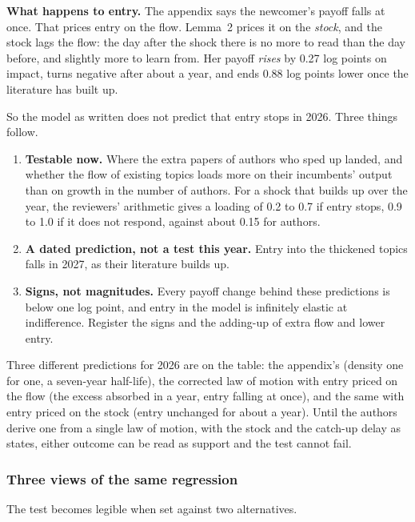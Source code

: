 \textbf{What happens to entry.} The appendix says the newcomer's payoff falls at once. That prices entry on the flow. Lemma~2 prices it on the \emph{stock}, and the stock lags the flow: the day after the shock there is no more to read than the day before, and slightly more to learn from. Her payoff \emph{rises} by 0.27 log points on impact, turns negative after about a year, and ends 0.88 log points lower once the literature has built up.

So the model as written does not predict that entry stops in 2026. Three things follow.

\begin{enumerate}
\item \textbf{Testable now.} Where the extra papers of authors who sped up landed, and whether the flow of existing topics loads more on their incumbents' output than on growth in the number of authors. For a shock that builds up over the year, the reviewers' arithmetic gives a loading of 0.2 to 0.7 if entry stops, 0.9 to 1.0 if it does not respond, against about 0.15 for authors.
\item \textbf{A dated prediction, not a test this year.} Entry into the thickened topics falls in 2027, as their literature builds up.
\item \textbf{Signs, not magnitudes.} Every payoff change behind these predictions is below one log point, and entry in the model is infinitely elastic at indifference. Register the signs and the adding-up of extra flow and lower entry.
\end{enumerate}

\begin{critbox}
Three different predictions for 2026 are on the table: the appendix's (density one for one, a seven-year half-life), the corrected law of motion with entry priced on the flow (the excess absorbed in a year, entry falling at once), and the same with entry priced on the stock (entry unchanged for about a year). Until the authors derive one from a single law of motion, with the stock and the catch-up delay as states, either outcome can be read as support and the test cannot fail.
\end{critbox}

\subsubsection{Three views of the same regression}
The test becomes legible when set against two alternatives.

